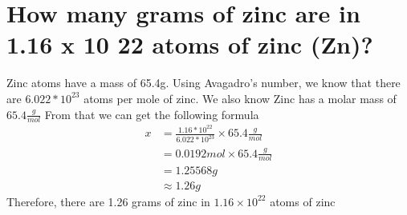 \documentclass[11pt]{article}
\begin{document}
\section{How many grams of zinc are in 1.16 x 10 22 atoms of zinc (Zn)?}
\label{sec:org93c32b5}
Zinc atoms have a mass of 65.4g. Using Avagadro's number, we know that there are \(6.022 *10^{23}\) atoms per mole of zinc.
We also know Zinc has a molar mass of \(65.4\frac{g}{mol}\)
From that we can get the following formula
\begin{align*}
x&=\frac{1.16*10^{22}}{6.022*10^{23}}\times65.4 \frac{g}{mol}\\
&=0.0192mol\times65.4\frac{g}{mol}\\
&=1.25568g\\
&\approx1.26g
\end{align*}
Therefore, there are 1.26 grams of zinc in \(1.16\times10^{22}\) atoms  of zinc
\end{document}
